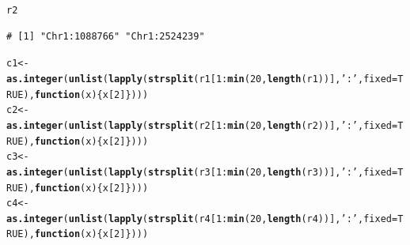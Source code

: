 \documentclass{article}\usepackage[]{graphicx}\usepackage[]{color}
\makeatletter
\newcommand{\hlnum}[1]{\textcolor[rgb]{0.686,0.059,0.569}{#1}}%
\newcommand{\hlstr}[1]{\textcolor[rgb]{0.192,0.494,0.8}{#1}}%
\newcommand{\hlopt}[1]{\textcolor[rgb]{0,0,0}{#1}}%
\newcommand{\hlstd}[1]{\textcolor[rgb]{0.345,0.345,0.345}{#1}}%
\newcommand{\hlkwa}[1]{\textcolor[rgb]{0.161,0.373,0.58}{\textbf{#1}}}%
\newcommand{\hlkwb}[1]{\textcolor[rgb]{0.69,0.353,0.396}{#1}}%
\newcommand{\hlkwc}[1]{\textcolor[rgb]{0.333,0.667,0.333}{#1}}%
\newcommand{\hlkwd}[1]{\textcolor[rgb]{0.737,0.353,0.396}{\textbf{#1}}}%
\newenvironment{kframe}{%
 \def\at@end@of@kframe{}%
 \ifinner\ifhmode%
  \def\at@end@of@kframe{\end{minipage}}%
  \begin{minipage}{\columnwidth}%
 \fi\fi%
 \def\FrameCommand##1{\hskip\@totalleftmargin \hskip-\fboxsep
 \colorbox{shadecolor}{##1}\hskip-\fboxsep
     \hskip-\linewidth \hskip-\@totalleftmargin \hskip\columnwidth}%
 \MakeFramed {\advance\hsize-\width
   \@totalleftmargin\z@ \linewidth\hsize
   \@setminipage}}%
 {\par\unskip\endMakeFramed%
 \at@end@of@kframe}
\newenvironment{knitrout}{}{} %
\makeatother
\begin{document}
\begin{knitrout}
\begin{kframe}
\begin{alltt}
\hlstd{r2}
\end{alltt}
\begin{verbatim}
# [1] "Chr1:1088766" "Chr1:2524239"
\end{verbatim}
\begin{alltt}
\hlstd{c1} \hlkwb{<-} \hlkwd{as.integer}\hlstd{(}\hlkwd{unlist}\hlstd{(}\hlkwd{lapply}\hlstd{(}\hlkwd{strsplit}\hlstd{(r1[}\hlnum{1}\hlopt{:}\hlkwd{min}\hlstd{(}\hlnum{20}\hlstd{,}\hlkwd{length}\hlstd{(r1))],}\hlstr{':'}\hlstd{,}\hlkwc{fixed}\hlstd{=}\hlnum{TRUE}\hlstd{),}\hlkwa{function}\hlstd{(}\hlkwc{x}\hlstd{)\{x[}\hlnum{2}\hlstd{]\})))}
\hlstd{c2} \hlkwb{<-} \hlkwd{as.integer}\hlstd{(}\hlkwd{unlist}\hlstd{(}\hlkwd{lapply}\hlstd{(}\hlkwd{strsplit}\hlstd{(r2[}\hlnum{1}\hlopt{:}\hlkwd{min}\hlstd{(}\hlnum{20}\hlstd{,}\hlkwd{length}\hlstd{(r2))],}\hlstr{':'}\hlstd{,}\hlkwc{fixed}\hlstd{=}\hlnum{TRUE}\hlstd{),}\hlkwa{function}\hlstd{(}\hlkwc{x}\hlstd{)\{x[}\hlnum{2}\hlstd{]\})))}
\hlstd{c3} \hlkwb{<-} \hlkwd{as.integer}\hlstd{(}\hlkwd{unlist}\hlstd{(}\hlkwd{lapply}\hlstd{(}\hlkwd{strsplit}\hlstd{(r3[}\hlnum{1}\hlopt{:}\hlkwd{min}\hlstd{(}\hlnum{20}\hlstd{,}\hlkwd{length}\hlstd{(r3))],}\hlstr{':'}\hlstd{,}\hlkwc{fixed}\hlstd{=}\hlnum{TRUE}\hlstd{),}\hlkwa{function}\hlstd{(}\hlkwc{x}\hlstd{)\{x[}\hlnum{2}\hlstd{]\})))}
\hlstd{c4} \hlkwb{<-} \hlkwd{as.integer}\hlstd{(}\hlkwd{unlist}\hlstd{(}\hlkwd{lapply}\hlstd{(}\hlkwd{strsplit}\hlstd{(r4[}\hlnum{1}\hlopt{:}\hlkwd{min}\hlstd{(}\hlnum{20}\hlstd{,}\hlkwd{length}\hlstd{(r4))],}\hlstr{':'}\hlstd{,}\hlkwc{fixed}\hlstd{=}\hlnum{TRUE}\hlstd{),}\hlkwa{function}\hlstd{(}\hlkwc{x}\hlstd{)\{x[}\hlnum{2}\hlstd{]\})))}


\end{alltt}
\end{kframe}
\end{knitrout}
\end{document}
